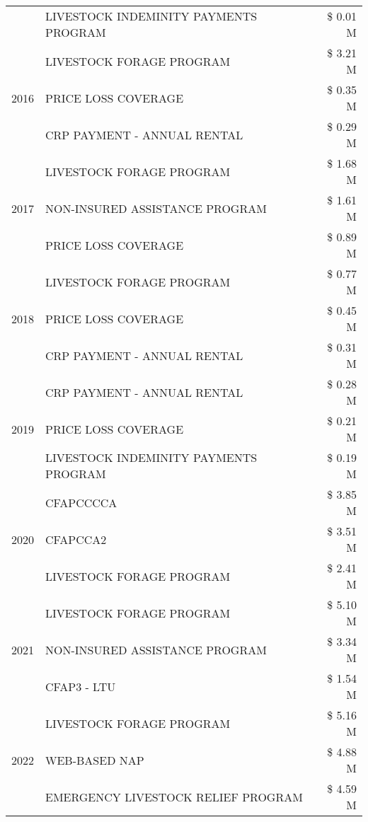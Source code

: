 \begin{tabular}{llr}
 & LIVESTOCK INDEMINITY PAYMENTS PROGRAM & \$ 0.01 M \\
\cline{1-3}
\multirow[t]{3}{*}{2016} & LIVESTOCK FORAGE PROGRAM & \$ 3.21 M \\
 & PRICE LOSS COVERAGE & \$ 0.35 M \\
 & CRP PAYMENT - ANNUAL RENTAL & \$ 0.29 M \\
\cline{1-3}
\multirow[t]{3}{*}{2017} & LIVESTOCK FORAGE PROGRAM & \$ 1.68 M \\
 & NON-INSURED ASSISTANCE PROGRAM & \$ 1.61 M \\
 & PRICE LOSS COVERAGE & \$ 0.89 M \\
\cline{1-3}
\multirow[t]{3}{*}{2018} & LIVESTOCK FORAGE PROGRAM & \$ 0.77 M \\
 & PRICE LOSS COVERAGE & \$ 0.45 M \\
 & CRP PAYMENT - ANNUAL RENTAL & \$ 0.31 M \\
\cline{1-3}
\multirow[t]{3}{*}{2019} & CRP PAYMENT - ANNUAL RENTAL & \$ 0.28 M \\
 & PRICE LOSS COVERAGE & \$ 0.21 M \\
 & LIVESTOCK INDEMINITY PAYMENTS PROGRAM & \$ 0.19 M \\
\cline{1-3}
\multirow[t]{3}{*}{2020} & CFAPCCCCA & \$ 3.85 M \\
 & CFAPCCA2 & \$ 3.51 M \\
 & LIVESTOCK FORAGE PROGRAM & \$ 2.41 M \\
\cline{1-3}
\multirow[t]{3}{*}{2021} & LIVESTOCK FORAGE PROGRAM & \$ 5.10 M \\
 & NON-INSURED ASSISTANCE PROGRAM & \$ 3.34 M \\
 & CFAP3 - LTU & \$ 1.54 M \\
\cline{1-3}
\multirow[t]{3}{*}{2022} & LIVESTOCK FORAGE PROGRAM & \$ 5.16 M \\
 & WEB-BASED NAP & \$ 4.88 M \\
 & EMERGENCY LIVESTOCK RELIEF PROGRAM & \$ 4.59 M \\
\cline{1-3}
\bottomrule
\end{tabular}
